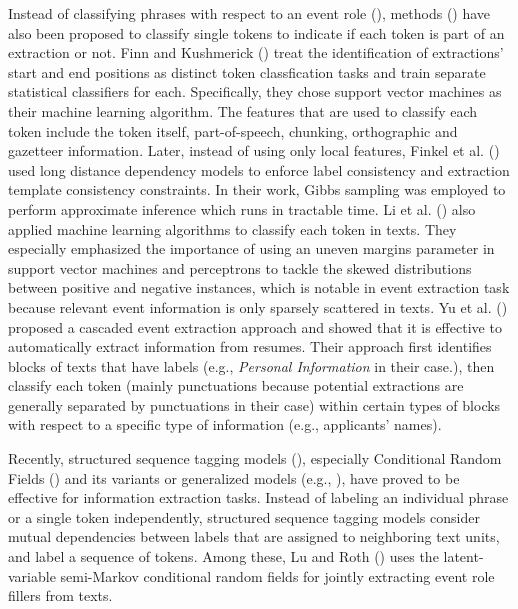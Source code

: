 Instead of classifying phrases 
with respect to 
an event role (\cite{freitag-icml98,chieu02}), 
methods (\cite{finn04,li05,yu05}) 
have also been 
proposed  
to classify single tokens to indicate if each token 
is part of an extraction or not. 
Finn and Kushmerick (\cite{finn04}) 
 treat the identification 
of extractions' start and end positions as distinct 
token classfication tasks and train separate statistical 
classifiers for each. 
Specifically, they chose support vector machines 
as their machine learning algorithm. 
The features that are used to classify 
each token include the token itself, part-of-speech, 
chunking, orthographic and gazetteer information. 
Later, instead of using only local features, Finkel et al. (\cite{finkel05}) 
used long distance dependency models to 
enforce label consistency and extraction 
template consistency constraints. 
In their work, Gibbs sampling was employed to 
perform approximate inference which runs in tractable time. 
Li et al. (\cite{li05}) also applied machine learning algorithms 
to classify each token in texts. 
They especially 
emphasized the importance of using an uneven margins 
parameter in support vector machines and perceptrons
to tackle the skewed distributions between 
positive and negative instances, which is notable 
in event extraction task because relevant event information 
is only sparsely scattered in texts.
Yu et al. (\cite{yu05}) proposed a 
cascaded event extraction approach
and showed that it is effective to 
automatically extract information from resumes. 
Their approach first identifies blocks of 
texts that have labels (e.g., {\it Personal Information} in their case.), 
then classify each token (mainly punctuations because 
potential extractions are generally separated by 
punctuations in their case) within certain types of blocks 
with respect to a specific type of information (e.g., applicants' names). 


Recently, structured sequence tagging models (\cite{Rabiner89,McCallum2000,CRFs01}), 
especially Conditional Random Fields (\cite{CRFs01,peng04}) and 
its variants or generalized models (e.g., \cite{bunescu04}), have 
proved to be effective 
for information extraction tasks. 
Instead of labeling an individual phrase or a single token 
independently, 
structured sequence tagging models consider 
mutual dependencies between labels that are assigned 
to neighboring text units, and label a sequence of tokens. 
Among these, Lu and Roth (\cite{Lu2012}) uses the latent-variable semi-Markov 
conditional random fields for jointly extracting event role fillers 
from texts.


